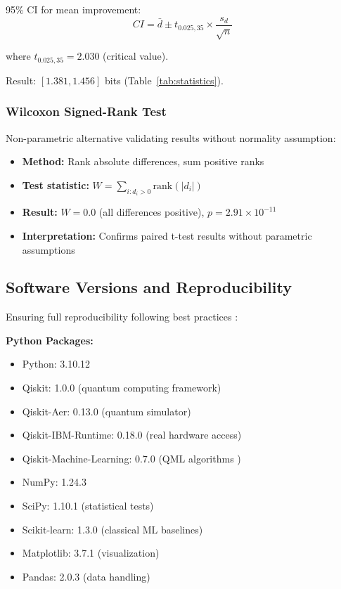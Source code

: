 \documentclass[11pt,letterpaper]{article}
\begin{document}
95\% CI for mean improvement:
\begin{equation}
CI = \bar{d} \pm t_{0.025, 35} \times \frac{s_d}{\sqrt{n}}
\end{equation}

where $t_{0.025, 35} = 2.030$ (critical value).

Result: $[1.381, 1.456]$ bits (Table~\ref{tab:statistics}).

\subsubsection{Wilcoxon Signed-Rank Test}

Non-parametric alternative validating results without normality assumption:

\begin{itemize}
\item \textbf{Method:} Rank absolute differences, sum positive ranks
\item \textbf{Test statistic:} $W = \sum_{i:d_i>0} \text{rank}(|d_i|)$
\item \textbf{Result:} $W=0.0$ (all differences positive), $p=2.91\times 10^{-11}$
\item \textbf{Interpretation:} Confirms paired t-test results without parametric assumptions
\end{itemize}

\subsection{Software Versions and Reproducibility}

Ensuring full reproducibility following best practices \cite{schuld2021machine}:

\textbf{Python Packages:}
\begin{itemize}
\item Python: 3.10.12
\item Qiskit: 1.0.0 (quantum computing framework)
\item Qiskit-Aer: 0.13.0 (quantum simulator)
\item Qiskit-IBM-Runtime: 0.18.0 (real hardware access)
\item Qiskit-Machine-Learning: 0.7.0 (QML algorithms \cite{schuld2021machine})
\item NumPy: 1.24.3
\item SciPy: 1.10.1 (statistical tests)
\item Scikit-learn: 1.3.0 (classical ML baselines)
\item Matplotlib: 3.7.1 (visualization)
\item Pandas: 2.0.3 (data handling)
\end{itemize}
\end{document}
